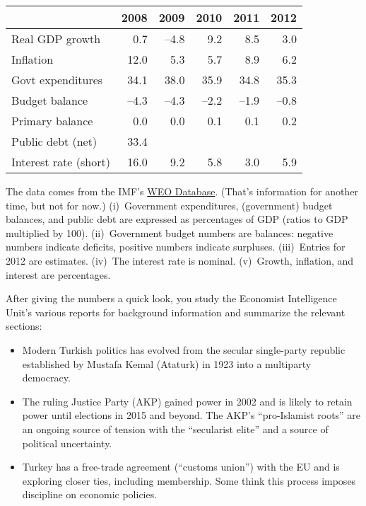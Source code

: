 \documentclass[12pt]{exam}
\begin{document}
\begin{questions}
\begin{center}
\begin{tabular}{lrrrrr}
\toprule
         & 2008 &  2009  &  2010 & 2011 & 2012 \\%
\midrule
Real GDP growth  & 0.7 & --4.8 & 9.2 & 8.5 & 3.0 \\
Inflation        & 12.0& 5.3 & 5.7 & 8.9 & 6.2 \\
Govt expenditures& 34.1 & 38.0 & 35.9 & 34.8 & 35.3 \\
Budget balance   &--4.3 &--4.3 &--2.2 &--1.9 &--0.8 \\
Primary balance  &  0.0 & 0.0 & 0.1 & 0.1 & 0.2 \\
Public debt (net)& 33.4 \\ %
Interest rate (short) \hspace*{0.2in}
                 & 16.0 & 9.2 & 5.8 & 3.0 & 5.9 \\
\bottomrule
\end{tabular}
\end{center}
The data comes from the IMF's
\href{http://www.imf.org/external/pubs/ft/weo/2012/02/weodata/index.aspx}{WEO Database}.
(That's information for another time, but not for now.)
(i)~Government expenditures, (government) budget balances,
and public debt are expressed as
percentages of GDP (ratios to GDP multiplied by 100).
(ii)~Government budget numbers are balances:
negative numbers indicate deficits,
positive numbers indicate surpluses.
(iii)~Entries for 2012 are estimates.
(iv)~The interest rate is nominal.
(v)~Growth, inflation, and interest are percentages.

After giving the numbers a quick look,
you study the Economist Intelligence Unit's
various reports for background information and summarize the relevant sections:
%
\begin{itemize}
\item Modern Turkish politics has evolved from the secular
single-party republic established by Mustafa Kemal (Ataturk) in 1923 into
a multiparty democracy.

\item The ruling Justice Party (AKP) gained power in 2002
and is likely to retain power until elections in 2015 and beyond.
    The AKP's ``pro-Islamist roots'' are an ongoing source of tension
    with the ``secularist elite'' and a source of
    political uncertainty.

\item Turkey has a free-trade agreement (``customs union'')
with the EU and is exploring closer ties, including membership.
Some think this process imposes discipline on economic policies.
\end{itemize}


\end{questions}
\end{document}
